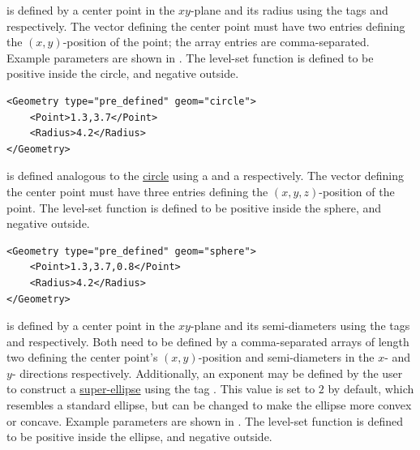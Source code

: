 \newpage

 is defined by a center point in the $xy$-plane and its radius using the tags  and  respectively. The vector defining the center point must have two entries defining the $(x,y)$-position of the point; the array entries are comma-separated. Example parameters are shown in . The level-set function is defined to be positive inside the circle, and negative outside.

\begin{minipage}{\linewidth}
\vspace{0.5cm}
\begin{lstlisting}[caption={Example parameters for defining a circle.},captionpos=b, label={lst:circle}]
<Geometry type="pre_defined" geom="circle"> 
    <Point>1.3,3.7</Point>
    <Radius>4.2</Radius>
</Geometry>
\end{lstlisting}
\end{minipage}

 is defined analogous to the \hyperlink{circle}{circle} using a  and a  respectively. The vector defining the center point must have three entries defining the $(x,y,z)$-position of the point. The level-set function is defined to be positive inside the sphere, and negative outside.

\begin{minipage}{\linewidth}
\vspace{0.5cm}
\begin{lstlisting}[caption={Example parameters for defining a circle.},captionpos=b, label={lst:sphere}]
<Geometry type="pre_defined" geom="sphere"> 
    <Point>1.3,3.7,0.8</Point>
    <Radius>4.2</Radius>
</Geometry>
\end{lstlisting}
\end{minipage}

 is defined by a center point in the $xy$-plane and its semi-diameters using the tags  and  respectively. Both need to be defined by a comma-separated arrays of length two defining the center point's $(x,y)$-position and semi-diameters in the $x$- and $y$- directions respectively. Additionally, an exponent may be defined by the user to construct a \href{https://en.wikipedia.org/wiki/Superellipse}{super-ellipse} using the tag . This value is set to $2$ by default, which resembles a standard ellipse, but can be changed to make the ellipse more convex or concave.
Example parameters are shown in . The level-set function is defined to be positive inside the ellipse, and negative outside.

